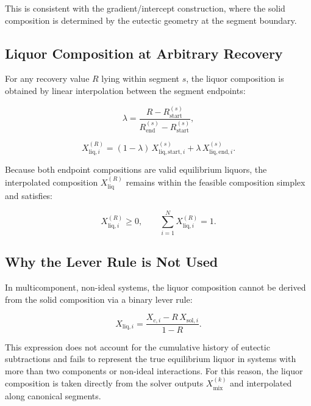 This is consistent with the gradient/intercept construction, where the solid
composition is determined by the eutectic geometry at the segment boundary.

\subsection{Liquor Composition at Arbitrary Recovery}

For any recovery value $R$ lying within segment $s$, the liquor composition is
obtained by linear interpolation between the segment endpoints:



\[
    \lambda = \frac{R - R_{\mathrm{start}}^{(s)}}
                   {R_{\mathrm{end}}^{(s)} - R_{\mathrm{start}}^{(s)}},
\]





\[
    X^{(R)}_{\mathrm{liq},i}
    = (1 - \lambda)\, X^{(s)}_{\mathrm{liq,start},i}
      + \lambda\, X^{(s)}_{\mathrm{liq,end},i}.
\]



Because both endpoint compositions are valid equilibrium liquors, the
interpolated composition $X^{(R)}_{\mathrm{liq}}$ remains within the feasible
composition simplex and satisfies:



\[
    X^{(R)}_{\mathrm{liq},i} \ge 0, \qquad
    \sum_{i=1}^N X^{(R)}_{\mathrm{liq},i} = 1.
\]



\subsection{Why the Lever Rule is Not Used}

In multicomponent, non-ideal systems, the liquor composition cannot be derived
from the solid composition via a binary lever rule:



\[
    X_{\mathrm{liq},i}
    = \frac{X_{c,i} - R\,X_{\mathrm{sol},i}}{1 - R}.
\]



This expression does not account for the cumulative history of eutectic
subtractions and fails to represent the true equilibrium liquor in systems with
more than two components or non-ideal interactions. For this reason, the liquor
composition is taken directly from the solver outputs $X^{(k)}_{\mathrm{mix}}$
and interpolated along canonical segments.

